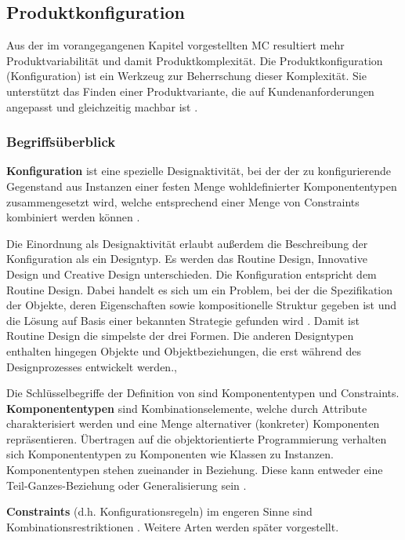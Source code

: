 \documentclass[12pt,a4paper,bibliography=totocnumbered,listof=totoc]{scrartcl}
\begin{document}
\pagebreak
\subsection{Produktkonfiguration}
\label{subssubsection:Produktkonfiguration}
 
Aus der im vorangegangenen Kapitel vorgestellten \ac{MC} resultiert mehr Produktvariabilität und damit Produktkomplexität. Die Produktkonfiguration (Konfiguration) ist ein Werkzeug zur Beherrschung dieser Komplexität. Sie unterstützt das Finden einer Produktvariante, die auf Kundenanforderungen angepasst und gleichzeitig machbar ist \citep{lutz11}.

\subsubsection{Begriffsüberblick}
\label{subsubsection:begriffsuberblick}
\textbf{Konfiguration} ist eine spezielle Designaktivität, bei der der zu konfigurierende Gegenstand aus Instanzen einer festen Menge wohldefinierter Komponententypen zusammengesetzt wird, welche entsprechend einer Menge von Constraints kombiniert werden können \citep{sabin98}.

Die Einordnung als Designaktivität erlaubt außerdem die Beschreibung der Konfiguration als ein Designtyp. Es werden das \glqq Routine Design\grqq{}, \glqq Innovative Design\grqq{} und \glqq Creative Design\grqq{} unterschieden. Die Konfiguration entspricht dem \glqq Routine Design\grqq{}. Dabei handelt es sich um ein Problem, bei der die Spezifikation der Objekte, deren Eigenschaften sowie kompositionelle Struktur gegeben ist und die Lösung auf Basis einer bekannten Strategie gefunden wird \citep{brown89}. Damit ist \glqq Routine Design\grqq{} die simpelste der drei Formen. Die anderen Designtypen enthalten hingegen Objekte und Objektbeziehungen, die erst während des Designprozesses entwickelt werden., 

Die Schlüsselbegriffe der Definition von \citeauthor{sabin98} sind Komponententypen und Constraints. \textbf{Komponententypen} sind Kombinationselemente, welche durch Attribute charakterisiert werden und eine Menge alternativer (konkreter) Komponenten repräsentieren. Übertragen auf die objektorientierte Programmierung verhalten sich Komponententypen zu Komponenten wie Klassen zu Instanzen. Komponententypen stehen zueinander in Beziehung. Diese kann entweder eine \glqq Teil-Ganzes\grqq{}-Beziehung oder Generalisierung sein \citep{felferning14}. 

\textbf{Constraints} (d.h. Konfigurationsregeln) im engeren Sinne sind Kombinationsrestriktionen \citep{felferning14}. Weitere Arten werden später vorgestellt.
\end{document}
